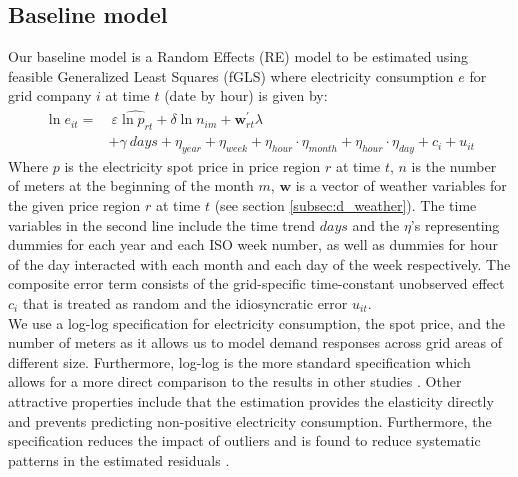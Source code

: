 \label{sec:empirical}
\subsection{Baseline model}
\label{subsec:e_model}
Our baseline model is a Random Effects (RE) model to be estimated using feasible Generalized Least Squares (fGLS) where electricity consumption $e$ for grid company $i$ at time $t$ (date by hour) is given by:
\begin{equation}
  \label{eq:baseline}
  \begin{split}
  \ln e_{it}=&\ \varepsilon \widehat{\ln p_{rt}}+\delta\ln n_{im}+\bm{w}^{'}_{rt}\lambda\\
  &+\gamma\ days+\eta_{year}+\eta_{week}+\eta_{hour}\cdot\eta_{month}+\eta_{hour}\cdot\eta_{day}+c_i+u_{it}
  \end{split}
\end{equation}
Where $p$ is the electricity spot price in price region $r$ at time $t$, $n$ is the number of meters at the beginning of the month $m$, $\bm{w}$ is a vector of weather variables for the given price region $r$ at time $t$ (see section \ref{subsec:d_weather}). The time variables in the second line include the time trend $days$ and the $\eta$'s representing dummies for each year and each ISO week number, as well as dummies for hour of the day interacted with each month and each day of the week respectively. The composite error term consists of the grid-specific time-constant unobserved effect $c_i$ that is treated as random and the idiosyncratic error $u_{it}$.
\medskip\\
We use a log-log specification for electricity consumption, the spot price, and the number of meters as it allows us to model demand responses across grid areas of different size. Furthermore, log-log is the more standard specification which allows for a more direct comparison to the results in other studies \citep{burke2017price}. Other attractive properties include that the estimation provides the elasticity directly and prevents predicting non-positive electricity consumption. Furthermore, the specification reduces the impact of outliers and is found to reduce systematic patterns in the estimated residuals \citep{burke2017price}.


